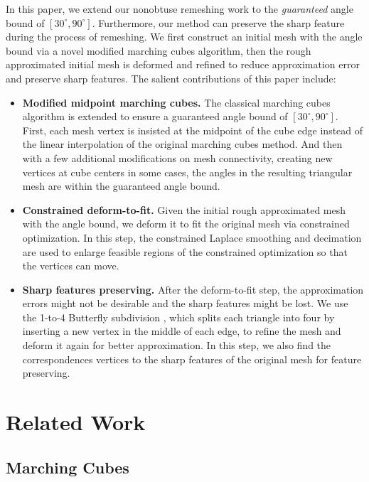 \documentclass[10pt,journal,cspaper,compsoc]{IEEEtran}
\begin{document}
In this paper, we extend our nonobtuse remeshing work \cite{LZ2006} to the \emph{guaranteed} angle bound of $[30^{\circ}, 90^{\circ}]$. Furthermore, our method can preserve the sharp feature during the process of remeshing. We first construct an initial mesh with the angle bound via a novel modified marching cubes algorithm, then the rough approximated initial mesh is deformed and refined to reduce approximation error and preserve sharp features. The salient contributions of this paper include:
\begin{itemize}
\item
\textbf{Modified midpoint marching cubes.} The classical marching cubes algorithm \cite{LC1987} is extended to ensure a guaranteed angle bound of $[30^{\circ}, 90^{\circ}]$. First, each mesh vertex is insisted at the midpoint of the cube edge instead of the linear interpolation of the original marching cubes method. And then with a few additional modifications on mesh connectivity, creating new vertices at cube centers in some cases, the angles in the resulting triangular mesh are within the guaranteed angle bound.

\item
\textbf{Constrained deform-to-fit.} Given the initial rough approximated mesh with the angle bound, we deform it to fit the original mesh via constrained optimization. In this step, the constrained Laplace smoothing and decimation are used to enlarge feasible regions of the constrained optimization so that the vertices can move.

\item
\textbf{Sharp features preserving.} After the deform-to-fit step, the approximation errors might not be desirable and the sharp features might be lost. We use the 1-to-4 Butterfly subdivision \cite{DLG1990, ZSS1996}, which splits each triangle into four by inserting a new vertex in the middle of each edge, to refine the mesh and deform it again for better approximation. In this step, we also find the correspondences vertices to the sharp features of the original mesh for feature preserving.

\end{itemize}


\section{Related Work}
\subsection{Marching Cubes}
\end{document}
